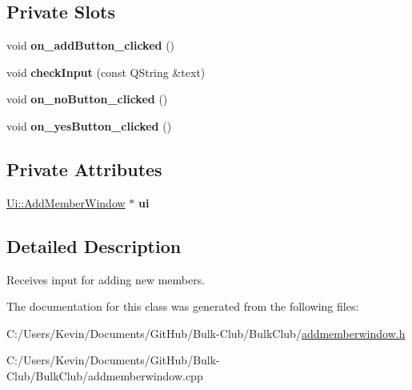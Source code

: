 \subsection*{Private Slots}
\begin{DoxyCompactItemize}
\item 
\mbox{\label{class_add_member_window_ab76bc07bd777526200167969e22b1c73}} 
void {\bfseries on\+\_\+add\+Button\+\_\+clicked} ()
\item 
\mbox{\label{class_add_member_window_a709d7c0307a261c135847160cfb98a69}} 
void {\bfseries check\+Input} (const Q\+String \&text)
\item 
\mbox{\label{class_add_member_window_a03f711e25306cde908775af426722d89}} 
void {\bfseries on\+\_\+no\+Button\+\_\+clicked} ()
\item 
\mbox{\label{class_add_member_window_ac0c0206c606db5f70d610d3d5c8239a3}} 
void {\bfseries on\+\_\+yes\+Button\+\_\+clicked} ()
\end{DoxyCompactItemize}
\subsection*{Private Attributes}
\begin{DoxyCompactItemize}
\item 
\mbox{\label{class_add_member_window_a247bde6200fc6b2b7a086d14946201f9}} 
\mbox{\hyperlink{class_ui_1_1_add_member_window}{Ui\+::\+Add\+Member\+Window}} $\ast$ {\bfseries ui}
\end{DoxyCompactItemize}


\subsection{Detailed Description}
Receives input for adding new members. 

The documentation for this class was generated from the following files\+:\begin{DoxyCompactItemize}
\item 
C\+:/\+Users/\+Kevin/\+Documents/\+Git\+Hub/\+Bulk-\/\+Club/\+Bulk\+Club/\mbox{\hyperlink{addmemberwindow_8h}{addmemberwindow.\+h}}\item 
C\+:/\+Users/\+Kevin/\+Documents/\+Git\+Hub/\+Bulk-\/\+Club/\+Bulk\+Club/addmemberwindow.\+cpp\end{DoxyCompactItemize}
